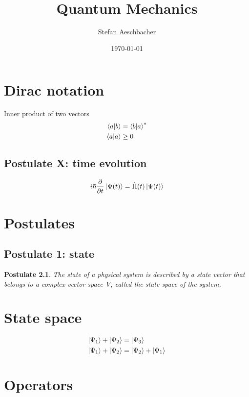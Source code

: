 \documentclass[10pt,a4paper]{book}
\title{Quantum Mechanics}
\author{Stefan Aeschbacher}
\date{\today}
\newtheorem{post}{Postulate}
\DeclareMathOperator {\opH} {\hat{H}}
\begin{document}
\maketitle


\chapter{Dirac notation}
Inner product of two vectors
\begin{align}
	\braket{a|b} & = \braket{b|a}^* \\
	\braket{a|a} & \ge 0
\end{align}

\section{Postulate X: time evolution}
\begin{align}
	i\hbar \frac{ \partial } { \partial t } \ket{ \Psi(t) } = \opH(t)\ket{ \Psi(t) }
\end{align}


\chapter{Postulates}
\section{Postulate 1: state}

\begin{post}
	The state of a physical system is described by a state vector that belongs to a complex vector space V, called the state space of the system.
\end{post}

\chapter{State space}
\begin{align}
	\ket{ \Psi_1} + \ket{ \Psi_2} & = \ket{ \Psi_3}                 \\
	\ket{ \Psi_1} + \ket{ \Psi_2} & = \ket{ \Psi_2} + \ket{ \Psi_1}
\end{align}
\chapter{Operators}
\end{document}
